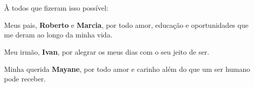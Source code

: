 
\chapter*{}
\vspace{15cm}
\begin{flushright}
	À todos que fizeram isso possível:

	Meus pais, \textbf{Roberto} e \textbf{Marcia}, por todo amor, educação e oportunidades que me deram ao longo da minha vida.

	Meu irmão, \textbf{Ivan}, por alegrar os meus dias com o seu jeito de ser.

	Minha querida \textbf{Mayane}, por todo amor e carinho além do que um ser humano pode receber.

\end{flushright}
